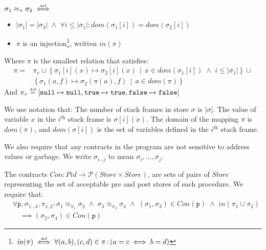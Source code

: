 \documentclass[runningheads,a4paper]{llncs}
\DeclareMathOperator{\band}{\bm{\;\land\;}}
\DeclareMathOperator{\suchthat}{:}
\newcommand*{\qvars}[2]{#1_{#2}}
\newcommand*{\powerset}[1]{\mathcal{P}(#1)}
\newcommand*{\domain}[1]{\mathit{dom}(#1)}
\newcommand*{\cardinality}[1]{\left|{#1}\right|}
\newcommand*{\defeq}{\stackrel{\text{\tiny def}}{=}}
\newcommand*{\defiff}{\stackrel{\text{\tiny def}}{\iff}}
\newcommand*{\setcomp}[2]{\left\{#1\,\middle|\,#2\right\}}
\newcommand*{\Store}{\mathit{Store}}
\newcommand*{\nullv}{\texttt{null}}
\newcommand*{\truev}{\texttt{true}}
\newcommand*{\falsev}{\texttt{false}}
\newcommand*{\Contract}{\mathit{Con}}
\newcommand*\iso{\approx}
\newcommand*{\PName}{\mathit{Pid}}
\newcommand*{\fun}{\texttt{p}}
\newcommand*{\bijection}[1]{\mathit{in}{\left(#1\right)}}
\newcommand*{\store}{\sigma}
\begin{document}
\newcommand*{\piv}{\pi_v}
\begin{definition}[Isomorphism]\label{def:global isomorphism}\setlength{\parindent}{0cm}~

	$\store_1\iso_\pi\store_2 \defiff$ 
	\begin{itemize}
		\item $\cardinality{\store_1} = \cardinality{\store_2} \band \forall i \le \cardinality{\store_1} \suchthat\domain{\store_1[i]} = \domain{\store_2[i]}$
		\item $\pi$ is an injection\footnote{$\bijection{\pi} \defiff \forall (a,b), (c,d) \in \pi \suchthat \left(a=c \iff b=d\right)$}, written $\bijection{\pi}$
	\end{itemize}

	Where $\pi$ is the smallest relation that satisfies:
		\[\begin{aligned}
		   \pi = &\piv \cup
		   \setcomp{\store_1[i](x)\mapsto\store_2[i](x)}{x \in \domain{\store_1[i]} \band i \le \cardinality{\store_1}} \cup \\
		   &\setcomp{\store_1(a,f)\mapsto\store_2(\pi(a),f)}{a \in \domain{\pi}}
		\end{aligned}\]
	And $\piv \defeq [\nullv\mapsto\nullv, \truev\mapsto\truev, \falsev\mapsto\falsev]$
\end{definition}

We use notation that: The number of stack frames in store $\store$ is $\cardinality{\store}$. The value of variable $x$ in the $i^{\textit{th}}$ stack frame is $\store[i](x)$. The domain of the mapping $\pi$ is $\domain{\pi}$, and $\domain{\store[i]}$ is the set of variables defined in the $i^{\textit{th}}$ stack frame. 

We also require that any contracts in the program are not sensitive to address values or garbage. We write $\qvars{\store}{i \ldots j}$ to mean $\store_i,\ldots,\store_j$.
\begin{definition}\label{def:contracts}
The contracts $\Contract: \PName \rightarrow \powerset{\Store \times \Store}$, are sets of pairs of $\Store$ representing the set of acceptable pre and post stores of each procedure. We require that:
\[\begin{aligned}
	&	\forall \fun,\qvars{\store}{1 \ldots 4},\qvars{\pi}{1,2} \suchthat 
		\store_1 \iso_{\pi_1} \store_2 \band \store_3 \iso_{\pi_2} \store_4 \band (\store_1,\store_3) \in \Contract(\fun) \band \bijection{\pi_1 \cup \pi_2}  \\
	&\quad	\implies 
		(\store_2,\store_4) \in \Contract(\fun)
\end{aligned}\]
\end{definition}
\end{document}
